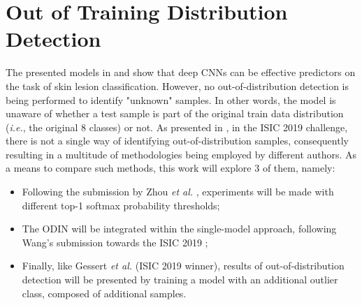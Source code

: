 \section{Out of Training Distribution Detection} \label{section:outdist}
    The presented models in  and  show that deep \ac{CNN}s can be effective predictors on the task of skin lesion classification. However, no out-of-distribution detection is being performed to identify "unknown" samples. In other words, the model is unaware of whether a test sample is part of the original train data distribution (\textit{i.e.}, the original 8 classes) or not. As presented in , in the \ac{ISIC} 2019 challenge, there is not a single way of identifying out-of-distribution samples, consequently resulting in a multitude of methodologies being employed by different authors. As a means to compare such methods, this work will explore 3 of them, namely:
    
    \begin{itemize}
        \item Following the submission by Zhou \textit{et al.} \cite{isic2019second}, experiments will be made with different top-1 softmax probability thresholds;
        \item The \ac{ODIN} \cite{odin} will be integrated within the single-model approach, following Wang's submission towards the \ac{ISIC} 2019 \cite{Wang};
        \item Finally, like Gessert \textit{et al.} \cite{isic2019first} (\ac{ISIC} 2019 winner), results of out-of-distribution detection will be presented by training a model with an additional outlier class, composed of additional samples.
    \end{itemize}
    
